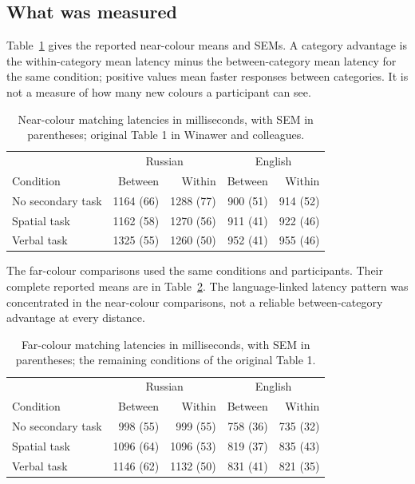 \subsection{What was measured}

Table~\ref{tab:p19-lc-blue-near} gives the reported near-colour means and
SEMs. A category advantage is the within-category mean latency minus
the between-category mean latency for the same condition; positive values
mean faster responses between categories. It is not a measure of how
many new colours a participant can see.

\begin{table}[htbp]
\centering
\begin{tabular}{lrrrr}
\hline
 &\multicolumn{2}{c}{Russian}&\multicolumn{2}{c}{English}\\
Condition&Between&Within&Between&Within\\ \hline
No secondary task&1164 (66)&1288 (77)&900 (51)&914 (52)\\
Spatial task&1162 (58)&1270 (56)&911 (41)&922 (46)\\
Verbal task&1325 (55)&1260 (50)&952 (41)&955 (46)\\ \hline
\end{tabular}
\caption{Near-colour matching latencies in milliseconds, with SEM in
parentheses; original Table 1 in Winawer and colleagues.}
\label{tab:p19-lc-blue-near}
\end{table}

The far-colour comparisons used the same conditions and participants.
Their complete reported means are in Table~\ref{tab:p19-lc-blue-far}.
The language-linked latency pattern was concentrated in the near-colour
comparisons, not a reliable between-category advantage at every distance.

\begin{table}[htbp]
\centering
\begin{tabular}{lrrrr}
\hline
 &\multicolumn{2}{c}{Russian}&\multicolumn{2}{c}{English}\\
Condition&Between&Within&Between&Within\\ \hline
No secondary task&998 (55)&999 (55)&758 (36)&735 (32)\\
Spatial task&1096 (64)&1096 (53)&819 (37)&835 (43)\\
Verbal task&1146 (62)&1132 (50)&831 (41)&821 (35)\\ \hline
\end{tabular}
\caption{Far-colour matching latencies in milliseconds, with SEM in
parentheses; the remaining conditions of the original Table 1.}
\label{tab:p19-lc-blue-far}
\end{table}

